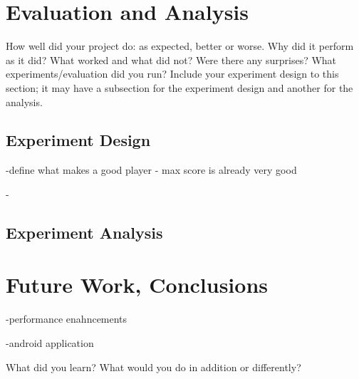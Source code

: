 \documentclass[letterpaper]{article}
\begin{document}
\section{Evaluation and Analysis}
How well did your project do: as expected, better or worse. Why did it perform as it did? What worked and what did not? Were there any surprises? What experiments/evaluation did you run? Include your experiment design to this section; it may have a subsection for the experiment design and another for the analysis.

\subsection{Experiment Design}
-define what makes a good player
- max score is already very good

-

\subsection{Experiment Analysis}

\section{Future Work, Conclusions}
-performance enahncements

-android application

What did you learn? What would you do in addition or differently?





\end{document}
